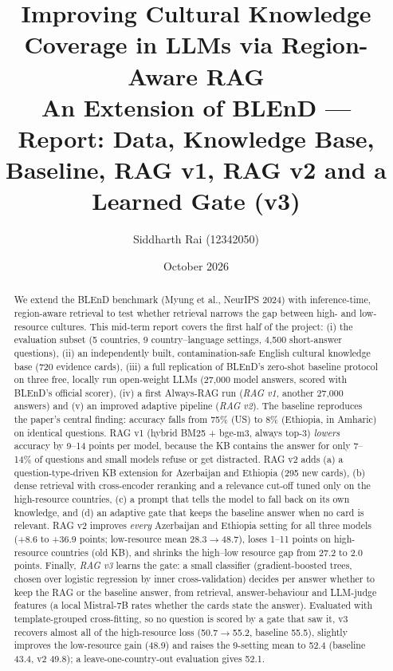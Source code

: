\documentclass[11pt]{article}
\title{Improving Cultural Knowledge Coverage in LLMs via Region-Aware RAG\\
\large An Extension of BLEnD --- Report: Data, Knowledge Base, Baseline, RAG v1, RAG v2 and a Learned Gate (v3)}
\author{Siddharth Rai (12342050)}
\date{October 2026}
\begin{document}
\maketitle

\begin{abstract}
We extend the BLEnD benchmark (Myung et al., NeurIPS 2024) with inference-time, region-aware retrieval
to test whether retrieval narrows the gap between high- and low-resource cultures. This mid-term report
covers the first half of the project: (i) the evaluation subset (5 countries, 9 country--language
settings, 4{,}500 short-answer questions), (ii) an independently built, contamination-safe English
cultural knowledge base (720 evidence cards), (iii) a full replication of BLEnD's zero-shot
baseline protocol on three free, locally run open-weight LLMs (27{,}000 model answers, scored with
BLEnD's official scorer), (iv) a first Always-RAG run (\emph{RAG v1}, another 27{,}000 answers) and
(v) an improved adaptive pipeline (\emph{RAG v2}). The baseline reproduces the paper's central
finding: accuracy falls from 75\% (US) to 8\% (Ethiopia, in Amharic) on identical questions.
RAG v1 (hybrid BM25 + bge-m3, always top-3) \emph{lowers} accuracy by 9--14 points per model, because
the KB contains the answer for only 7--14\% of questions and small models refuse or get distracted.
RAG v2 adds (a) a question-type-driven KB extension for Azerbaijan and Ethiopia (295 new cards),
(b) dense retrieval with cross-encoder reranking and a relevance cut-off tuned only on the
high-resource countries, (c) a prompt that tells the model to fall back on its own knowledge, and
(d) an adaptive gate that keeps the baseline answer when no card is relevant. RAG v2 improves
\emph{every} Azerbaijan and Ethiopia setting for all three models (+8.6 to +36.9 points; low-resource
mean 28.3$\rightarrow$48.7), loses 1--11 points on high-resource countries (old KB), and shrinks the
high--low resource gap from 27.2 to 2.0 points. Finally, \emph{RAG v3} learns the gate: a small
classifier (gradient-boosted trees, chosen over logistic regression by inner cross-validation) decides
per answer whether to keep the RAG or the baseline answer, from retrieval, answer-behaviour and
LLM-judge features (a local Mistral-7B rates whether the cards state the answer). Evaluated with
template-grouped cross-fitting, so no question is scored by a gate that saw it, v3 recovers almost
all of the high-resource loss (50.7$\rightarrow$55.2, baseline 55.5), slightly improves the
low-resource gain (48.9) and raises the 9-setting mean to 52.4 (baseline 43.4, v2 49.8); a
leave-one-country-out evaluation gives 52.1.
\end{abstract}
\end{document}
